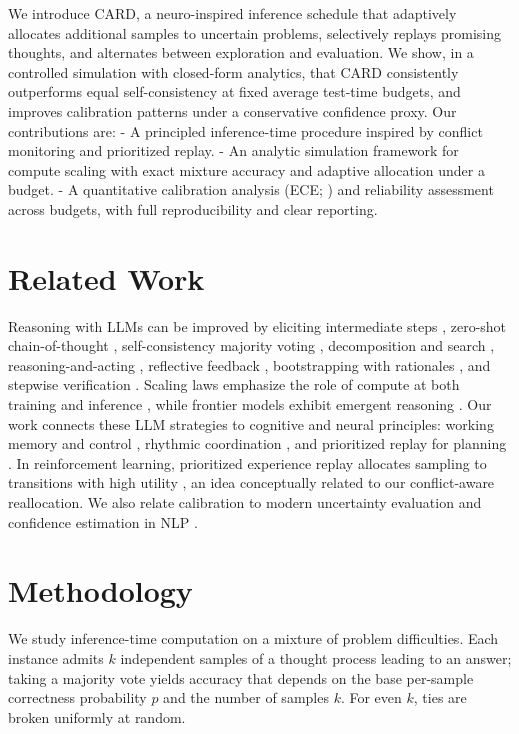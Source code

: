 \documentclass[11pt]{article}
\begin{document}
We introduce CARD, a neuro-inspired inference schedule that adaptively allocates additional samples to uncertain problems, selectively replays promising thoughts, and alternates between exploration and evaluation.
We show, in a controlled simulation with closed-form analytics, that CARD consistently outperforms equal self-consistency at fixed average test-time budgets, and improves calibration patterns under a conservative confidence proxy.
Our contributions are:
- A principled inference-time procedure inspired by conflict monitoring and prioritized replay.
- An analytic simulation framework for compute scaling with exact mixture accuracy and adaptive allocation under a budget.
- A quantitative calibration analysis (ECE; \citealp{Guo2017Calibration}) and reliability assessment across budgets, with full reproducibility and clear reporting.

\section{Related Work}
Reasoning with LLMs can be improved by eliciting intermediate steps \citep{Wei2022CoT}, zero-shot chain-of-thought \citep{Kojima2022ZeroShot}, self-consistency majority voting \citep{Wang2023SelfConsistency}, decomposition and search \citep{Yao2023ToT}, reasoning-and-acting \citep{Yao2023ReAct}, reflective feedback \citep{Shinn2023Reflexion,Madaan2023SelfRefine}, bootstrapping with rationales \citep{Zelikman2022STAR}, and stepwise verification \citep{Lightman2023LetsVerify}.
Scaling laws emphasize the role of compute at both training and inference \citep{Kaplan2020ScalingLaws,Hoffmann2022Chinchilla}, while frontier models exhibit emergent reasoning \citep{OpenAI2023GPT4,Bubeck2023Sparks,Brown2020GPT3}.
Our work connects these LLM strategies to cognitive and neural principles: working memory and control \citep{Baddeley2012WorkingMemory,Botvinick2001ConflictMonitoring}, rhythmic coordination \citep{Fries2015Rhythms}, and prioritized replay for planning \citep{Mattar2018PrioritizedReplay,Gershman2018Hippocampus}. In reinforcement learning, prioritized experience replay allocates sampling to transitions with high utility \citep{Schaul2016PER}, an idea conceptually related to our conflict-aware reallocation. We also relate calibration to modern uncertainty evaluation \citep{Guo2017Calibration,Kadavath2022Know} and confidence estimation in NLP \citep{DesaiDurrett2020Calibration, Minderer2021Revisiting, Lakshminarayanan2017DeepEns}.

\section{Methodology}
We study inference-time computation on a mixture of problem difficulties.
Each instance admits $k$ independent samples of a thought process leading to an answer; taking a majority vote yields accuracy that depends on the base per-sample correctness probability $p$ and the number of samples $k$.
For even $k$, ties are broken uniformly at random.
\end{document}
